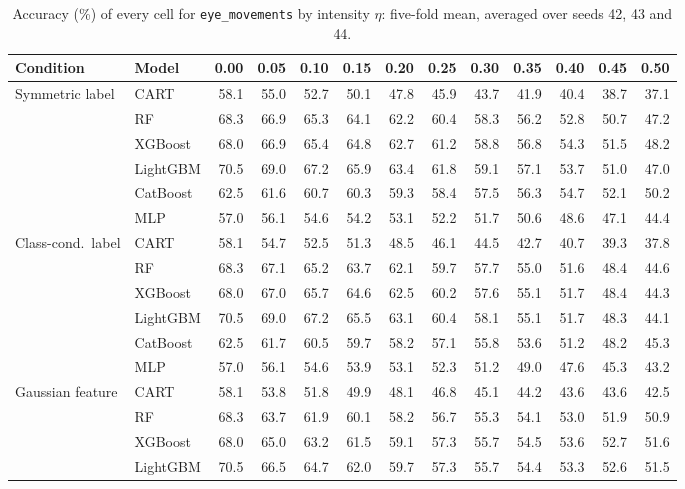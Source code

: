 \begin{table}[p]
\centering
\tiny
\setlength{\tabcolsep}{2.6pt}
\caption{Accuracy (\%) of every cell for \texttt{eye\_movements} by intensity $\eta$: five-fold mean, averaged over seeds 42, 43 and 44.}
\label{tab:grid_eye_movements}
\begin{tabular}{@{}llrrrrrrrrrrr@{}}
\toprule
Condition & Model & 0.00 & 0.05 & 0.10 & 0.15 & 0.20 & 0.25 & 0.30 & 0.35 & 0.40 & 0.45 & 0.50 \\
\midrule
Symmetric label & CART & 58.1 & 55.0 & 52.7 & 50.1 & 47.8 & 45.9 & 43.7 & 41.9 & 40.4 & 38.7 & 37.1 \\
 & RF & 68.3 & 66.9 & 65.3 & 64.1 & 62.2 & 60.4 & 58.3 & 56.2 & 52.8 & 50.7 & 47.2 \\
 & XGBoost & 68.0 & 66.9 & 65.4 & 64.8 & 62.7 & 61.2 & 58.8 & 56.8 & 54.3 & 51.5 & 48.2 \\
 & LightGBM & 70.5 & 69.0 & 67.2 & 65.9 & 63.4 & 61.8 & 59.1 & 57.1 & 53.7 & 51.0 & 47.0 \\
 & CatBoost & 62.5 & 61.6 & 60.7 & 60.3 & 59.3 & 58.4 & 57.5 & 56.3 & 54.7 & 52.1 & 50.2 \\
 & MLP & 57.0 & 56.1 & 54.6 & 54.2 & 53.1 & 52.2 & 51.7 & 50.6 & 48.6 & 47.1 & 44.4 \\
\midrule
Class-cond.\ label & CART & 58.1 & 54.7 & 52.5 & 51.3 & 48.5 & 46.1 & 44.5 & 42.7 & 40.7 & 39.3 & 37.8 \\
 & RF & 68.3 & 67.1 & 65.2 & 63.7 & 62.1 & 59.7 & 57.7 & 55.0 & 51.6 & 48.4 & 44.6 \\
 & XGBoost & 68.0 & 67.0 & 65.7 & 64.6 & 62.5 & 60.2 & 57.6 & 55.1 & 51.7 & 48.4 & 44.3 \\
 & LightGBM & 70.5 & 69.0 & 67.2 & 65.5 & 63.1 & 60.4 & 58.1 & 55.1 & 51.7 & 48.3 & 44.1 \\
 & CatBoost & 62.5 & 61.7 & 60.5 & 59.7 & 58.2 & 57.1 & 55.8 & 53.6 & 51.2 & 48.2 & 45.3 \\
 & MLP & 57.0 & 56.1 & 54.6 & 53.9 & 53.1 & 52.3 & 51.2 & 49.0 & 47.6 & 45.3 & 43.2 \\
\midrule
Gaussian feature & CART & 58.1 & 53.8 & 51.8 & 49.9 & 48.1 & 46.8 & 45.1 & 44.2 & 43.6 & 43.6 & 42.5 \\
 & RF & 68.3 & 63.7 & 61.9 & 60.1 & 58.2 & 56.7 & 55.3 & 54.1 & 53.0 & 51.9 & 50.9 \\
 & XGBoost & 68.0 & 65.0 & 63.2 & 61.5 & 59.1 & 57.3 & 55.7 & 54.5 & 53.6 & 52.7 & 51.6 \\
 & LightGBM & 70.5 & 66.5 & 64.7 & 62.0 & 59.7 & 57.3 & 55.7 & 54.4 & 53.3 & 52.6 & 51.5 \\

\end{tabular}
\end{table}
